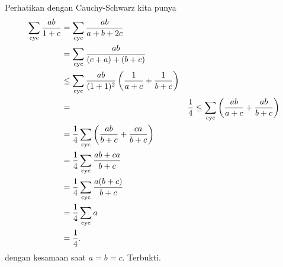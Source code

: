 
\begin{solusi}
    Perhatikan dengan Cauchy-Schwarz kita punya
    \begin{align*}
        \sum_{\mathrm{cyc}} \dfrac{ab}{1+c} &= \sum_{\mathrm{cyc}} \dfrac{ab}{a+b+2c}\\
        &= \sum_{\mathrm{cyc}} \dfrac{ab}{(c+a)+(b+c)}\\
        &\le \sum_{\mathrm{cyc}} \dfrac{ab}{(1+1)^2}\left(\dfrac{1}{a+c} + \dfrac{1}{b+c}\right)\\
        &= &\dfrac{1}{4}\le \sum_{\mathrm{cyc}} \left(\dfrac{ab}{a+c} + \dfrac{ab}{b+c}\right)\\
        &= \dfrac{1}{4}\sum_{\mathrm{cyc}} \left(\dfrac{ab}{b+c}+\dfrac{ca}{b+c}\right)\\
        &= \dfrac{1}{4}\sum_{\mathrm{cyc}} \dfrac{ab+ca}{b+c}\\
        &= \dfrac{1}{4}\sum_{\mathrm{cyc}} \dfrac{a(b+c)}{b+c}\\
        &= \dfrac{1}{4}\sum_{\mathrm{cyc}} a\\
        &= \dfrac{1}{4}.
    \end{align*}
    dengan kesamaan saat $a=b=c$. Terbukti.
\end{solusi}